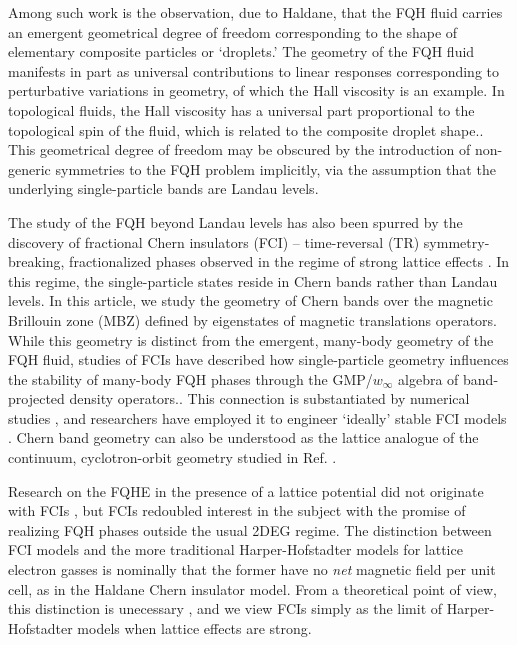 \documentclass[aps,prb,twocolumn,letterpaper,twoside,nobalancelastpage,groupedaddress,amsmath,amssymb,floatfix,citeautoscript]{revtex4-1}
\begin{document}
Among such work is the observation, due to Haldane, that the FQH fluid carries an emergent geometrical degree of freedom\cite{haldane_geometrical_2011} corresponding to the shape of elementary composite particles or `droplets.' \cite{johri_probing_2016} The geometry of the FQH fluid manifests in part as universal contributions to linear responses corresponding to perturbative variations in geometry, of which the Hall viscosity\cite{avron_viscosity_1995,tokatly_lorentz_2007,read_non-abelian_2009,haldane_hall_2009} is an example. In topological fluids, the Hall viscosity has a universal part proportional to the topological spin of the fluid\cite{read_non-abelian_2009}, which is related to the composite droplet shape.\cite{johri_probing_2016}. This geometrical degree of freedom may be obscured by the introduction of non-generic symmetries to the FQH problem implicitly, via the assumption that the underlying single-particle bands are Landau levels.


The study of the FQH beyond Landau levels has also been spurred by the discovery of fractional Chern insulators (FCI) -- time-reversal (TR) symmetry-breaking, fractionalized phases observed in the regime of strong lattice effects \cite{Bergholtz:2013ue,parameswaran_fractional_2013}. In this regime, the single-particle states reside in Chern bands rather than Landau levels. In this article, we study the geometry of Chern bands over the magnetic Brillouin zone (MBZ) defined by eigenstates of magnetic translations operators\cite{zak_magnetic_1964}. While this geometry is distinct from the emergent, many-body geometry of the FQH fluid, studies of FCIs have described how single-particle geometry influences the stability of many-body FQH phases through the GMP/$w_{\infty}$ algebra of band-projected density operators.\cite{Girvin:1986bu,parameswaran_fractional_2012,parameswaran_fractional_2013, roy_band_2014}. This connection is substantiated by numerical studies \cite{jackson_geometric_2015,Claassen2015,bauer_quantum_2016}, and researchers have employed it to engineer `ideally' stable FCI models \cite{Lee2017}. Chern band geometry can also be understood as the lattice analogue of the continuum, cyclotron-orbit geometry studied in Ref. .

 Research on the FQHE in the presence of a lattice potential did not originate with FCIs \cite{kol_fractional_1993,sorensen_fractional_2005,palmer_high-field_2006}, but FCIs redoubled interest in the subject with the promise of realizing FQH phases outside the usual 2DEG regime. The distinction between FCI models and the more traditional Harper-Hofstadter \cite{harper_general_1955,Azbel:1964tk,hofstadter_energy_nodate} models for lattice electron gasses is nominally that the former have no \textit{net} magnetic field per unit cell, as in the Haldane Chern insulator model\cite{haldane_model_1988}. From a theoretical point of view, this distinction is unecessary \cite{mcgreevy_wave_2012}, and we view FCIs simply as the limit of Harper-Hofstadter models when lattice effects are strong. 
\end{document}
